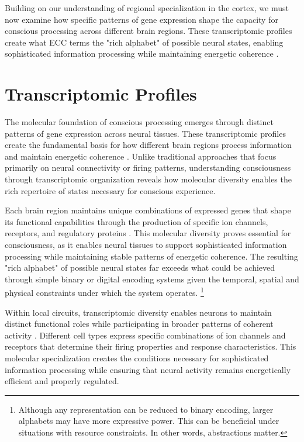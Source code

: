 \begin{refsection}
Building on our understanding of regional specialization in the cortex, we must now examine how specific patterns of gene expression shape the capacity for conscious processing across different brain regions. These transcriptomic profiles create what ECC terms the "rich alphabet" of possible neural states, enabling sophisticated information processing while maintaining energetic coherence \cite{Lake2018}.

\section{Transcriptomic Profiles}

The molecular foundation of conscious processing emerges through distinct patterns of gene expression across neural tissues. These transcriptomic profiles create the fundamental basis for how different brain regions process information and maintain energetic coherence \cite{Tasic2018}. Unlike traditional approaches that focus primarily on neural connectivity or firing patterns, understanding consciousness through transcriptomic organization reveals how molecular diversity enables the rich repertoire of states necessary for conscious experience.

Each brain region maintains unique combinations of expressed genes that shape its functional capabilities through the production of specific ion channels, receptors, and regulatory proteins \cite{Bakken2021}. This molecular diversity proves essential for consciousness, as it enables neural tissues to support sophisticated information processing while maintaining stable patterns of energetic coherence. The resulting "rich alphabet" of possible neural states far exceeds what could be achieved through simple binary or digital encoding systems given the temporal, spatial and physical constraints under which the system operates. \footnote{Although any representation can be reduced to binary encoding, larger alphabets may have more expressive power. This can be beneficial under situations with resource constraints. In other words, abstractions matter.}

Within local circuits, transcriptomic diversity enables neurons to maintain distinct functional roles while participating in broader patterns of coherent activity \cite{Lake2016}. Different cell types express specific combinations of ion channels and receptors that determine their firing properties and response characteristics. This molecular specialization creates the conditions necessary for sophisticated information processing while ensuring that neural activity remains energetically efficient and properly regulated.


\end{refsection}
